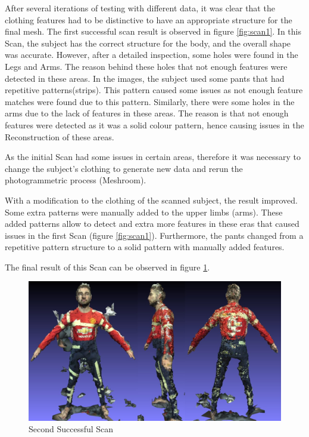 \documentclass[12pt]{report}
\begin{document}
After several iterations of testing with different data, it was clear that the clothing features had to be distinctive to have an appropriate structure for the final mesh.
The first successful scan result is observed in figure \ref{fig:scan1}.
In this Scan, the subject has the correct structure for the body, and the overall shape was accurate. However, after a detailed inspection, some holes were found in the Legs and Arms.
The reason behind these holes that not enough features were detected in these areas. In the images, the subject used some pants that had repetitive patterns(strips). 
This pattern caused some issues as not enough feature matches were found due to this pattern. 
Similarly, there were some holes in the arms due to the lack of features in these areas. The reason is that not enough features were detected as it was a solid colour pattern, hence causing issues in the Reconstruction of these areas. 

As the initial Scan had some issues in certain areas, therefore it was necessary to change the subject's clothing to generate new data and rerun the photogrammetric process (Meshroom). 

With a modification to the clothing of the scanned subject, the result improved.
Some extra patterns were manually added to the upper limbs (arms). These added patterns allow to detect and extra more features in these eras that caused issues in the first Scan (figure \ref{fig:scan1}).
Furthermore, the pants changed from a repetitive pattern structure to a solid pattern with manually added features. 

The final result of this Scan can be observed in figure \ref{fig:scan2}.
\begin{figure}[H]%
  \centering
 \includegraphics[width=1\textwidth]{scan2.png}
\caption{Second Successful Scan}
\label{fig:scan2} 
\end{figure}
\end{document}
